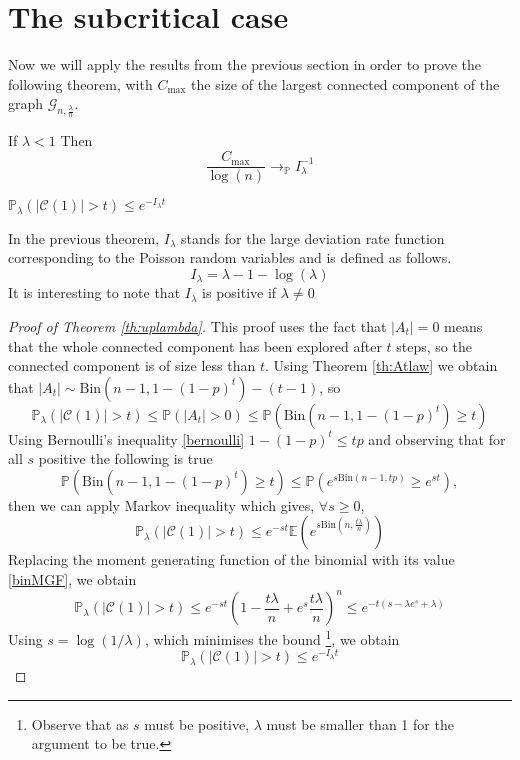 \section{The subcritical case}
Now we will apply the results from the previous section in order to prove the following theorem, with $C_{\max}$ the size of the largest connected component of the graph $\mathcal{G}_{n, \frac{\lambda}{n}}$.
\begin{theorem}\label{th:subCritCV}
	If $\lambda < 1$
	\newline
	Then
	\begin{equation}
		\frac{C_{\max}}{\log(n)} \longrightarrow_\mathbb{P} I_{\lambda}^{-1}
	\end{equation}
\end{theorem}
\begin{theorem}\label{th:uplambda}
	$\mathbb{P}_{\lambda}(|\mathcal{C}(1)| >t) \leq e^{-I_{\lambda}t}$
\end{theorem}
In the previous theorem, $I_{\lambda}$ stands for the large deviation rate function corresponding to the Poisson random variables and is defined as follows.
\begin{equation}
	I_{\lambda} = \lambda - 1 - \log(\lambda)
\end{equation}
It is interesting to note that $I_\lambda$ is positive if $\lambda \neq 0$
\begin{proof}[Proof of Theorem \ref{th:uplambda}]
	This proof uses the fact that $|A_t| = 0$ means that the whole connected component has been explored after $t$ steps, so the connected component is of size less than $t$.
	Using Theorem \ref{th:Atlaw} we obtain that $|A_t| \sim \text{Bin}(n-1, 1-(1-p)^t) - (t-1)$, so 
	\begin{equation}
		\mathbb{P}_{\lambda}(|\mathcal{C}(1)| > t ) \leq \mathbb{P}(|A_t|>0) \leq \mathbb{P}(\text{Bin}(n-1, 1-(1-p)^t) \geq t)
	\end{equation}
	Using Bernoulli's inequality \eqref{bernoulli} $ 1- (1-p)^t \leq tp$ and observing that for all $s$ positive the following is true
	\begin{equation}
		\mathbb{P}(\text{Bin}(n-1, 1-(1-p)^t) \geq t) \leq \mathbb{P}(e^{s\text{Bin}(n-1, tp)} \geq e^{st}),
	\end{equation}
	then we can apply Markov inequality which gives, $\forall s \geq 0$, 
	\begin{equation}
		\mathbb{P}_{\lambda}(|\mathcal{C}(1)| > t ) \leq e^{-st}\mathbb{E}(e^{s\text{Bin}(n, \frac{t\lambda}{n})})
	\end{equation}
	Replacing the moment generating function of the binomial with its value \eqref{binMGF}, we obtain 
	\begin{equation}
		\mathbb{P}_{\lambda}(|\mathcal{C}(1)| > t ) \leq e^{-st}(1 - \frac{t\lambda}{n} + e^s\frac{t\lambda}{n})^n \leq e^{-t(s - \lambda e^s + \lambda)}
	\end{equation}
	Using $s=\log(1/\lambda)$, which minimises the bound \footnote{ Observe that as $s$ must be positive, $\lambda$ must be smaller than 1 for the argument to be true.}, we obtain
	\begin{equation}
		\mathbb{P}_{\lambda}(|\mathcal{C}(1)| >t) \leq e^{-I_{\lambda}t}
	\end{equation}
\end{proof}
